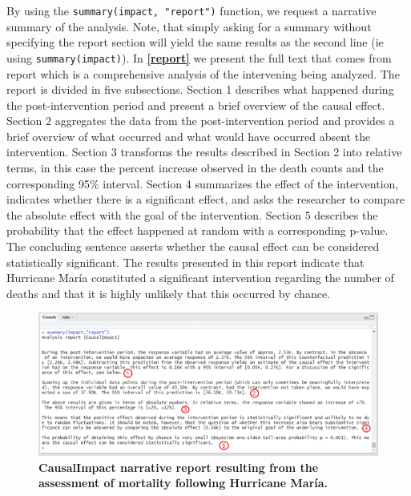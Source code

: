 \documentclass[12pt]{article}
\begin{document}
By using the \texttt{summary(impact,\ "report")} function, we request a
narrative summary of the analysis. Note, that simply asking for a
summary without specifying the report section will yield the same
results as the second line (ie using \texttt{summary(impact)}). In
\textbf{\autoref{report}} we present the full text that comes from
report which is a comprehensive analysis of the intervening being
analyzed. The report is divided in five subsections. Section 1 describes
what happened during the post-intervention period and present a brief
overview of the causal effect. Section 2 aggregates the data from the
post-intervention period and provides a brief overview of what occurred
and what would have occurred absent the intervention. Section 3
transforms the results described in Section 2 into relative terms, in
this case the percent increase observed in the death counts and the
corresponding 95\% interval. Section 4 summarizes the effect of the
intervention, indicates whether there is a significant effect, and asks
the researcher to compare the absolute effect with the goal of the
intervention. Section 5 describes the probability that the effect
happened at random with a corresponding p-value. The concluding sentence
asserts whether the causal effect can be considered statistically
significant. The results presented in this report indicate that
Hurricane María constituted a significant intervention regarding the
number of deaths and that it is highly unlikely that this occurred by
chance.

\begin{figure}
\includegraphics[width=1\linewidth]{../MainDocument/Picture1} \caption{\textbf{CausalImpact narrative report resulting from the assessment of mortality following Hurricane María.}\label{report}}\label{fig:unnamed-chunk-9}
\end{figure}
\end{document}

